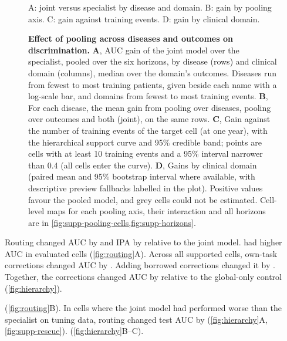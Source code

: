\begin{figure}[H]
    {A: joint versus specialist by disease and domain. B: gain by pooling axis.
    C: gain against training events. D: gain by clinical domain.}
  \caption{\textbf{Effect of pooling across diseases and outcomes on
  discrimination.} \textbf{A}, AUC gain of the joint model over the
  specialist, pooled over the six horizons, by disease (rows) and clinical
  domain (columns), median over the domain's outcomes. Diseases run from fewest to most training patients, given beside each name with a log-scale bar, and domains from fewest to most training events.
  \textbf{B}, For each disease, the mean gain from pooling
  over diseases, pooling over outcomes and both (joint), on the same rows.
  \textbf{C}, Gain against the number of training events of the target cell
  (at one year),
  with the hierarchical support curve and 95\% credible band; points are cells
  with at least 10 training events and a 95\% interval narrower than 0.4 (all
  cells enter the curve).  \textbf{D}, Gains
  by clinical domain (paired mean and 95\% bootstrap interval where
  available, with descriptive preview fallbacks labelled in the plot). Positive
  values favour the pooled model, and grey cells could not be estimated.
  Cell-level maps for each pooling axis, their
  interaction and all horizons are in
  \cref{fig:supp-pooling-cells,fig:supp-horizons}.}
  \label{fig:pooling}
\end{figure}

\FloatBarrier
{}
Routing changed AUC by  and IPA by
 relative to the joint model. \opera{} had higher AUC in
 evaluated cells (\cref{fig:routing}A).
Across all supported cells, own-task corrections changed AUC by .
Adding borrowed corrections changed it by .
Together, the corrections changed AUC by 
relative to the global-only control (\cref{fig:hierarchy}).

 (\cref{fig:routing}B).
In cells where the joint model had performed worse than the specialist on
tuning data, routing changed test AUC by 
(\cref{fig:hierarchy}A, \cref{fig:supp-rescue}).
(\cref{fig:hierarchy}B--C).

